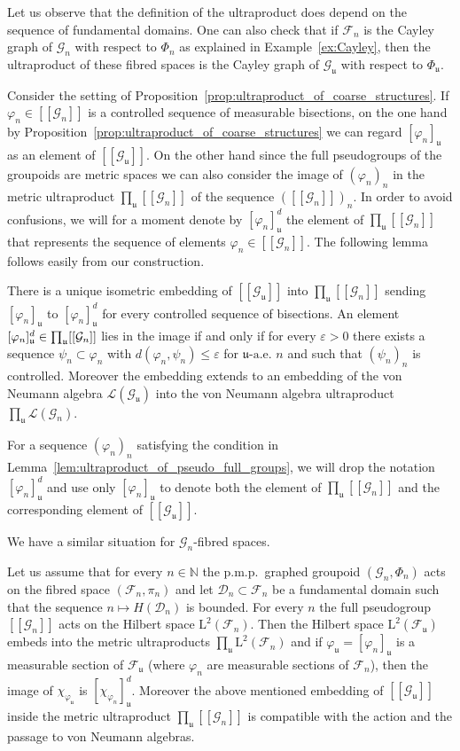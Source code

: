 \documentclass[AHL,Unicode,longabstracts,published]{cedram}
\newcommand{\Nmath}{\mathbb{N}}
\newcommand{\LL}{\mathcal{L}}
\newcommand{\cg}{\mathcal{G}}
\newcommand{\cf}{\mathcal{F}}
\newcommand{\cd}{\mathcal{D}}
\newcommand{\LLh}{\mathrm{L}}
\newcommand{\uu}{\mathfrak{u}}
\newcommand{\ul}{\mathfrak{u}}
\newcommand{\ulae}{\mathfrak{u}\textrm{-a.e. }n}
\newcommand{\eps}{\varepsilon}
\newcommand{\ph}{\varphi}
\newcommand{\pmp}{p.m.p.\ }
\begin{document}
Let us observe that the definition of the ultraproduct does depend on the sequence of fundamental domains. One can also check that if $\cf_n$ is the Cayley graph of $\cg_n$ with respect to $\Phi_n$ as explained in Example~\ref{ex:Cayley}, then the ultraproduct of these fibred spaces is the Cayley graph of $\cg_\ul$ with respect to $\Phi_\ul$.

Consider the setting of Proposition~\ref{prop:ultraproduct_of_coarse_structures}. If $\ph_n \in [[\cg_n]]$ is a controlled sequence of measurable bisections, on the one hand by Proposition~\ref{prop:ultraproduct_of_coarse_structures} we can regard $[\ph_n]_\ul$ as an element of $[[\cg_\ul]]$. On the other hand since the full pseudogroups of the groupoids are metric spaces we can also consider the image of $(\ph_n)_n$ in the metric ultraproduct $\prod_\uu [[\cg_n]]$ of the sequence $([[\cg_n]])_n$. In order to avoid confusions, we will for a moment denote by $[\ph_n]_\ul^d$ the element of $\prod_\uu [[\cg_n]]$ that represents the sequence of elements $\ph_n\in [[\cg_n]]$. The following lemma follows easily from our construction.

\begin{lemm}\label{lem:ultraproduct_of_pseudo_full_groups}
There is a unique isometric embedding of $[[\cg_\ul]]$ into $\prod_\uu [[\cg_n]]$ sending $[\ph_n]_\ul$ to $[\ph_n]_\ul^d$ for every controlled sequence of bisections. An element $[\ph_n]_\ul^d\linebreak\in \prod_\uu [[\cg_n]]$ lies in the image if and only if for every $\eps>0$ there exists a sequence $\psi_n \subset
\ph_n$ with $d(\ph_n,\psi_n) \leq \eps$ for $\ulae$ and such that $(\psi_n)_n$ is controlled. Moreover the embedding extends to an embedding of the von Neumann algebra $\LL(\cg_\uu)$ into the von Neumann algebra ultraproduct $\prod_\uu \LL(\cg_n)$.
\end{lemm}

For a sequence $(\varphi_n)_n$ satisfying the condition in Lemma~\ref{lem:ultraproduct_of_pseudo_full_groups}, we will drop the notation $[\ph_n]_\ul^d$ and use only $[\ph_n]_\ul$ to denote both the element of $\prod_\uu [[\cg_n]]$ and the corresponding element of $[[\cg_\ul]]$.

We have a similar situation for $\cg_n$-fibred spaces.

\begin{lemm}\label{lem:ultraproductactions}
Let us assume that for every $n\in\Nmath$ the \pmp graphed groupoid $(\cg_n,\Phi_n)$ acts on the fibred space $(\cf_n,\pi_n)$ and let $\cd_n\subset\cf_n$ be a fundamental domain such that the sequence $n\mapsto H(\cd_n)$ is bounded. For every $n$ the full pseudogroup $[[\cg_n]]$ acts on the Hilbert space $\LLh^2(\cf_n)$. Then the Hilbert space $\LLh^2(\cf_\ul)$ embeds into the metric ultraproducts $\prod_\ul \LLh^2(\cf_n)$ and if $\ph_\ul=[\ph_n]_\ul$ is a measurable section of $\cf_\ul$ (where $\ph_n$ are measurable sections of $\cf_n$), then the image of $\chi_{\ph_\ul}$ is $[\chi_{\ph_n}]_\ul^d$. Moreover the above mentioned embedding of $[[\cg_\ul]]$ inside the metric ultraproduct $\prod_\uu [[\cg_n]]$ is compatible with the action and the passage to von Neumann algebras.
\end{lemm}
\end{document}
